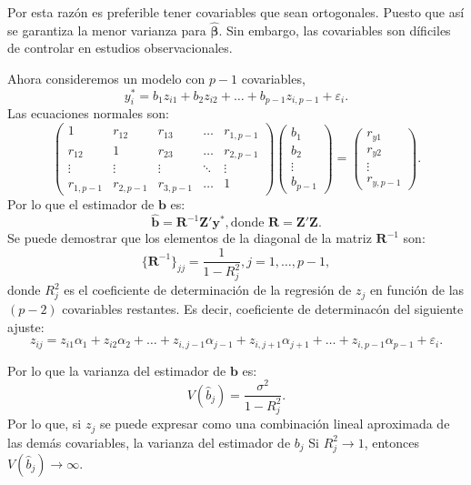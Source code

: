 \documentclass[
]{article}
\begin{document}
Por esta razón es preferible tener covariables que sean ortogonales. Puesto que así se garantiza la menor varianza para \(\widehat{\boldsymbol \beta}\). Sin embargo, las covariables son díficiles de controlar en estudios observacionales.

Ahora consideremos un modelo con \(p-1\) covariables,
\[
y_{i}^{*} = b_{1}z_{i1} + b_{2}z_{i2} + \ldots + b_{p-1}z_{i,p-1} + \varepsilon_{i}.
\]
Las ecuaciones normales son:
\[
\begin{pmatrix}
1 & r_{12} & r_{13} & \ldots & r_{1,p-1}  \\ r_{12} & 1 & r_{23} & \ldots & r_{2,p-1} \\
\vdots & \vdots & \vdots & \ddots & \vdots \\
r_{1,p-1} & r_{2,p-1} & r_{3,p-1} & \ldots & 1
\end{pmatrix} \begin{pmatrix}
b_{1} \\ b_{2} \\ \vdots \\ b_{p-1}
\end{pmatrix} = \begin{pmatrix}
r_{y1} \\ r_{y2} \\ \vdots \\ r_{y,p-1}
\end{pmatrix}.
\]
Por lo que el estimador de \(\boldsymbol b\) es:
\[
\widehat{\boldsymbol b}= \boldsymbol R^{-1}\boldsymbol Z'\boldsymbol y^{*}, \mbox{donde }\boldsymbol R= \boldsymbol Z'\boldsymbol Z.
\]
Se puede demostrar que los elementos de la diagonal de la matriz \(\boldsymbol R^{-1}\) son:
\[
\{\boldsymbol R^{-1}\}_{jj} = \frac{1}{1-R^{2}_{j}}, j=1,\ldots,p-1,
\]
donde \(R^{2}_{j}\) es el coeficiente de determinación de la regresión de \(z_{j}\) en función de las \((p-2)\) covariables restantes. Es decir, coeficiente de determinacón del siguiente ajuste:
\[
z_{ij} = z_{i1}\alpha_1 + z_{i2}\alpha_2 + \ldots + z_{i,j-1}\alpha_{j-1} + z_{i,j+1}\alpha_{j+1} + \ldots + z_{i,p-1}\alpha_{p-1} + \varepsilon_i.
\]

Por lo que la varianza del estimador de \(\boldsymbol b\) es:
\[
V(\widehat{b}_{j}) = \frac{\sigma^{2}}{1-R^{2}_{j}}.
\]
Por lo que, si \(z_j\) se puede expresar como una combinación lineal aproximada de las demás covariables, la varianza del estimador de \(b_j\) Si \(R^{2}_{j} \rightarrow 1\), entonces \(V(\widehat{b}_{j})\rightarrow \infty\).
\end{document}
